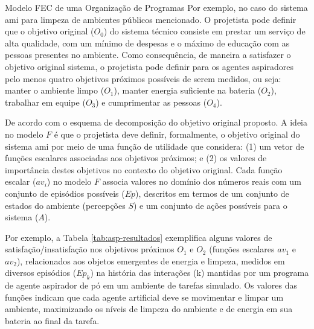 \begin{section}{Modelo FEC de uma Organização de Programas}
    Por exemplo, no caso do sistema \acrshort{ami} para limpeza de ambientes públicos mencionado. O projetista pode definir que o objetivo original ($O_0$) do sistema técnico consiste em prestar um serviço de alta qualidade, com um mínimo de despesas e o máximo de educação com as pessoas presentes no ambiente. Como consequência, de maneira a satisfazer o objetivo original sistema, o projetista pode definir para os agentes aspiradores pelo menos quatro objetivos próximos possíveis de serem medidos, ou seja: manter o ambiente limpo ($O_1$), manter energia suficiente na bateria ($O_2$), trabalhar em equipe ($O_3$) e cumprimentar as pessoas ($O_4$).
    
    De acordo com o esquema de decomposição do objetivo original proposto. A ideia no modelo $F$ é que o projetista deve definir, formalmente, o objetivo original do sistema \acrshort{ami} por meio de uma função de utilidade que considera: (1) um vetor de funções escalares associadas aos objetivos próximos; e (2) os valores de importância destes objetivos no contexto do objetivo original. Cada função escalar ($av_i$) no modelo $F$ associa valores no domínio dos números reais com um conjunto de episódios possíveis ($Ep$), descritos em termos de um conjunto de estados do ambiente (percepções $S$) e um conjunto de ações possíveis para o sistema ($A$).
    
    Por exemplo, a Tabela \ref{tab:asp-resultados} exemplifica alguns valores de satisfação/insatisfação nos objetivos próximos $O_1$ e $O_2$ (funções escalares $av_1$ e $av_2$), relacionados aos objetos emergentes de energia e limpeza, medidos em diversos episódios ($Ep_k$) na história das interações (k) mantidas por um programa de agente aspirador de pó em um ambiente de tarefas simulado. Os valores das funções indicam que cada agente artificial deve se movimentar e limpar um ambiente, maximizando os níveis de limpeza do ambiente e de energia em sua bateria ao final da tarefa.
    

\end{section}
